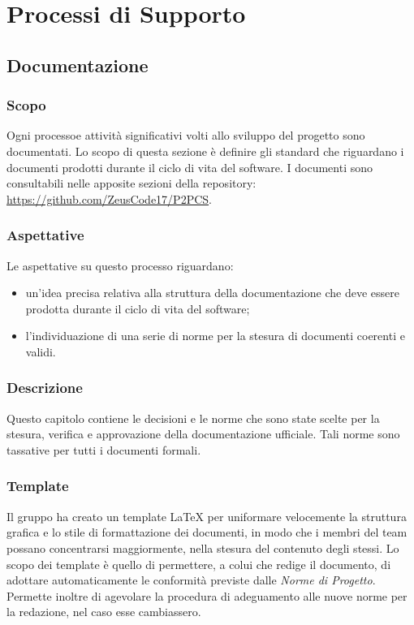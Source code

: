 \section{Processi di Supporto}
\subsection{Documentazione}
	\subsubsection{Scopo}
	Ogni processo\glosp e attività significativi volti allo sviluppo del progetto sono documentati. Lo scopo di questa sezione è definire gli standard che riguardano i documenti prodotti durante il ciclo di vita del software.
	I documenti sono consultabili nelle apposite sezioni della repository\glo:\\ \url{https://github.com/ZeusCode17/P2PCS}. 		
	\subsubsection{Aspettative}
	Le aspettative su questo processo riguardano:
	\begin{itemize}
		\item un'idea precisa relativa alla struttura della documentazione che deve essere prodotta durante il ciclo di vita del software;
		\item l'individuazione di una serie di norme per la stesura di documenti coerenti e validi.
	\end{itemize}
	\subsubsection{Descrizione}
	Questo capitolo contiene le decisioni e le norme che sono state scelte per la
	stesura, verifica e approvazione della documentazione ufficiale.  Tali norme  sono  tassative  per  tutti  i  documenti  formali.

	\subsubsection{Template}
	Il gruppo ha creato un template \LaTeX{} per uniformare velocemente la struttura grafica e lo stile di formattazione dei documenti, in modo che i membri del team possano concentrarsi maggiormente, nella stesura del contenuto degli stessi. Lo scopo dei template è quello di permettere, a colui che redige il documento, di adottare automaticamente le conformità previste dalle \textit{Norme di Progetto}. Permette inoltre di agevolare la procedura di adeguamento alle nuove norme per la redazione, nel caso esse cambiassero.
